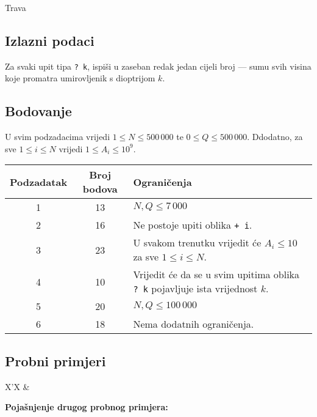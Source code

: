 \begin{statement}[
  problempoints=100,
  timelimit=1 sekunda,
  memorylimit=512 MiB,
]{Trava}
\subsection*{Izlazni podaci}

Za svaki upit tipa \texttt{\frenchspacing? k}, ispiši u zaseban redak jedan cijeli broj — sumu svih visina koje promatra umirovljenik s dioptrijom $k$.

\subsection*{Bodovanje}

U svim podzadacima vrijedi $1 \leq N \leq 500\,000$ te $0 \leq Q \leq 500\,000$. Ddodatno, za sve $1 \leq i \leq N$ vrijedi $1 \leq A_i \leq 10^9$.

{\renewcommand{\arraystretch}{1.4}
  \setlength{\tabcolsep}{6pt}
  \begin{tabular}{ccl}
   Podzadatak & Broj bodova & Ograničenja \\ \midrule
   	1 & 13 & $N, Q \leq 7\,000$ \\
   	2 & 16 & Ne postoje upiti oblika \texttt{+ i}. \\
   	3 & 23 & U svakom trenutku vrijedit će $A_i \leq 10$ za sve $1 \leq i \leq N$. \\
   	4 & 10 & Vrijedit će da se u svim upitima oblika \texttt{\frenchspacing? k} pojavljuje ista vrijednost $k$. \\
   	5 & 20 & $N, Q \leq 100\,000$ \\
   	6 & 18 & Nema dodatnih ograničenja. \\ 
\end{tabular}}

\subsection*{Probni primjeri}
\begin{tabularx}{\textwidth}{X'X}
 &
\end{tabularx}

\pagebreak

\textbf{Pojašnjenje drugog probnog primjera:}\\


\end{statement}

